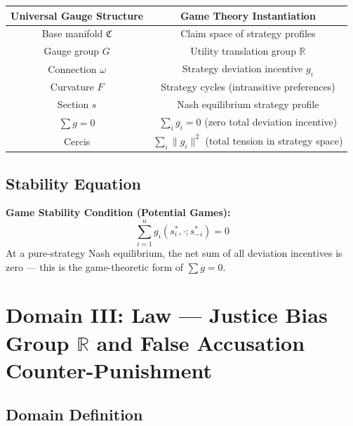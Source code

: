 \documentclass[12pt,a4paper]{article}
\theoremstyle{plain}
\theoremstyle{definition}
\newcommand{\R}{\mathbb{R}}
\newcommand{\curv}{F}
\newcommand{\conn}{\omega}
\newcommand{\ClaimSpace}{\mathfrak{C}}
\begin{document}
\begin{center}
\begin{tabular}{c|c}
    \toprule
    \textbf{Universal Gauge Structure} & \textbf{Game Theory Instantiation} \\
    \midrule
    Base manifold $\ClaimSpace$ & Claim space of strategy profiles \\
    Gauge group $G$ & Utility translation group $\R$ \\
    Connection $\conn$ & Strategy deviation incentive $g_i$ \\
    Curvature $\curv$ & Strategy cycles (intransitive preferences) \\
    Section $s$ & Nash equilibrium strategy profile \\
    $\sum g = 0$ & $\sum_i g_i = 0$ (zero total deviation incentive) \\
    Cercis & $\sum_i \|g_i\|^2$ (total tension in strategy space) \\
    \bottomrule
\end{tabular}
\end{center}

\subsection{Stability Equation}

\begin{keyeq}
\textbf{Game Stability Condition (Potential Games):}
\begin{equation}
    \boxed{\sum_{i=1}^{n} g_i(s_i^*, \cdot; s_{-i}^*) = 0}
\end{equation}
At a pure-strategy Nash equilibrium, the net sum of all deviation incentives is zero — this is the game-theoretic form of $\sum g = 0$.
\end{keyeq}

\newpage


\section{Domain III: Law — Justice Bias Group $\R$ and False Accusation Counter-Punishment}

\subsection{Domain Definition}
\end{document}

